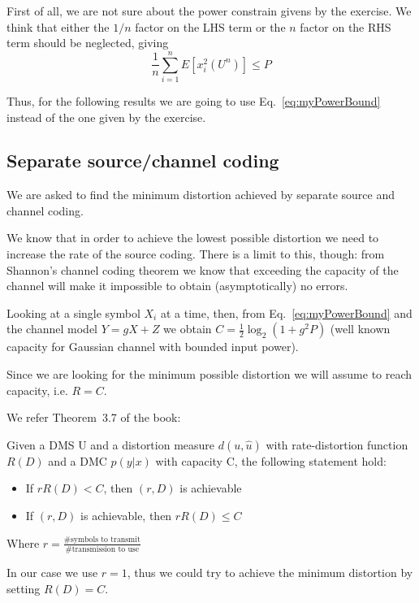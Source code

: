 
First of all, we are not sure about the power constrain givens by the exercise. We think that either the $1/n$ factor on the LHS term or the $n$ factor on the RHS term should be neglected, giving
%
\begin{equation}\label{eq:myPowerBound}
\frac{1}{n} \sum_{i=1}^n E[x_i^2(U^n)] \leq P
\end{equation}

Thus, for the following results we are going to use Eq.~\eqref{eq:myPowerBound} instead of the one given by the exercise.

\subsection{Separate source/channel coding}
We are asked to find the minimum distortion achieved by separate source and channel coding.

We know that in order to achieve the lowest possible distortion we need to increase the rate of the source coding. There is a limit to this, though: from Shannon's channel coding theorem we know that exceeding the capacity of the channel will make it impossible to obtain (asymptotically) no errors.

Looking at a single symbol $X_i$ at a time, then, from Eq.~\eqref{eq:myPowerBound} and the channel model $Y=gX+Z$ we obtain $C= \frac{1}{2} \log_2(1+g^2P)$ (well known capacity for Gaussian channel with bounded input power).

Since we are looking for the minimum possible distortion we will assume to reach capacity, i.e. $R=C$.

We refer Theorem~3.7 of the book:
%
\begin{theorem}
Given a DMS U and a distortion measure $d(u,\hat{u})$ with rate-distortion function $R(D)$ and a DMC $p(y|x)$ with capacity C, the following statement hold:
\begin{itemize}
	\item If $rR(D)<C$, then $(r,D)$ is achievable
	\item If $(r,D)$ is achievable, then $rR(D) \leq C$
\end{itemize}
Where $r=\frac{\mbox{\#symbols to transmit}}{\mbox{\#transmission to use}}$
\end{theorem}
In our case we use $r=1$, thus we could try to achieve the minimum distortion by setting $R(D)=C$.

